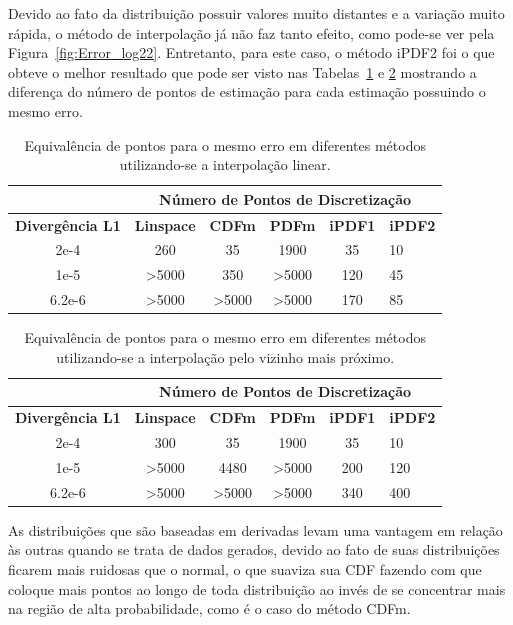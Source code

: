 Devido ao fato da distribuição possuir valores muito distantes e a variação muito rápida, o método de interpolação já não faz tanto efeito, como pode-se ver pela Figura~\ref{fig:Error_log22}. Entretanto, para este caso, o método \ac{iPDF2} foi o que obteve o melhor resultado que pode ser visto nas Tabelas~\ref{tab:error_eq} e \ref{tab:error_eq_near} mostrando a diferença do número de pontos de estimação para cada estimação possuindo o mesmo erro.

\begin{table}[H]
	\centering
	\caption{Equivalência de pontos para o mesmo erro em diferentes métodos utilizando-se a interpolação linear.}
	\label{tab:error_eq}
\begin{tabular}{c|ccccl}
	& \multicolumn{5}{c}{\textbf{Número de Pontos de Discretização}}    \\ \hline
	\textbf{Divergência L1}  & \textbf{Linspace} & \textbf{CDFm} & \textbf{PDFm}  & \textbf{iPDF1} & \textbf{iPDF2} \\ \hline
	2e-4  & 260      & 35   & 1900   & 35    & 10    \\ \hline
	1e-5 & >5000    & 350  & >5000 & 120   & 45    \\ \hline
	6.2e-6 & >5000    & >5000 & >5000 & 170   & 85  
\end{tabular}
\end{table}

\begin{table}[H]
	\centering
	\caption{Equivalência de pontos para o mesmo erro em diferentes métodos utilizando-se a interpolação pelo vizinho mais próximo.}
	\label{tab:error_eq_near}
	\begin{tabular}{c|ccccl}
		& \multicolumn{5}{c}{\textbf{Número de Pontos de Discretização}}    \\ \hline
		\textbf{Divergência L1}  & \textbf{Linspace} & \textbf{CDFm} & \textbf{PDFm}  & \textbf{iPDF1} & \textbf{iPDF2} \\ \hline
		2e-4  & 300      & 35   & 1900   & 35    & 10    \\ \hline
		1e-5 & >5000    & 4480  & >5000 & 200   & 120    \\ \hline
		6.2e-6 & >5000    & >5000 & >5000 & 340   & 400  
	\end{tabular}
\end{table}




As distribuições que são baseadas em derivadas levam uma vantagem em relação às outras quando se trata de dados gerados, devido ao fato de suas distribuições ficarem mais ruidosas que o normal, o que suaviza sua CDF fazendo com que coloque mais pontos ao longo de toda distribuição ao invés de se concentrar mais na região de alta probabilidade, como é o caso do método \ac{CDFm}.

